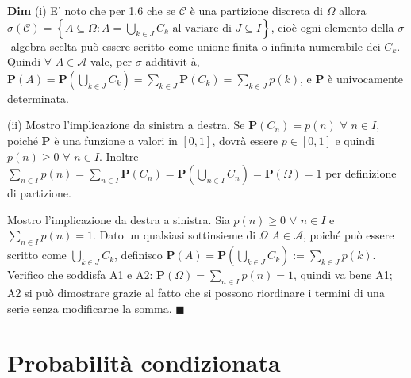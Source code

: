 \documentclass{article}
\begin{document}
\textbf{Dim }(i) E' noto che per 1.6 che se $\mathcal{C}$ \`{e} una
partizione discreta di $\Omega $ allora $\sigma \left( \mathcal{C}\right)
=\left\{ A\subseteq \Omega :A=\bigcup_{k\in J}C_{k}\text{ al variare di }%
J\subseteq I\right\} $, cio\`{e} ogni elemento della $\sigma $-algebra
scelta pu\`{o} essere scritto come unione finita o infinita numerabile dei $%
C_{k}$. Quindi $\forall $ $A\in \mathcal{A}$ vale, per $\sigma $-additivit%
\`{a}, $\mathbf{P}\left( A\right) =\mathbf{P}\left( \bigcup_{k\in
J}C_{k}\right) =\sum_{k\in J}\mathbf{P}\left( C_{k}\right) =\sum_{k\in
J}p\left( k\right) $, e $\mathbf{P}$ \`{e} univocamente determinata.

(ii) Mostro l'implicazione da sinistra a destra. Se $\mathbf{P}\left(
C_{n}\right) =p\left( n\right) $ $\forall $ $n\in I$, poich\'{e} $\mathbf{P}$
\`{e} una funzione a valori in $\left[ 0,1\right] $, dovr\`{a} essere $p\in %
\left[ 0,1\right] $ e quindi $p\left( n\right) \geq 0$ $\forall $ $n\in I$.
Inoltre $\sum_{n\in I}p\left( n\right) =\sum_{n\in I}\mathbf{P}\left(
C_{n}\right) =\mathbf{P}\left( \bigcup_{n\in I}C_{n}\right) =\mathbf{P}%
\left( \Omega \right) =1$ per definizione di partizione.

Mostro l'implicazione da destra a sinistra. Sia $p\left( n\right) \geq 0$ $%
\forall $ $n\in I$ e $\sum_{n\in I}p\left( n\right) =1$. Dato un qualsiasi
sottinsieme di $\Omega $ $A\in \mathcal{A}$, poich\'{e} pu\`{o} essere
scritto come $\bigcup_{k\in J}C_{k}$, definisco $\mathbf{P}\left( A\right) =%
\mathbf{P}\left( \bigcup_{k\in J}C_{k}\right) :=\sum_{k\in J}p\left(
k\right) $. Verifico che soddisfa A1 e A2: $\mathbf{P}\left( \Omega \right)
=\sum_{n\in I}p\left( n\right) =1$, quindi va bene A1; A2 si pu\`{o}
dimostrare grazie al fatto che si possono riordinare i termini di una serie
senza modificarne la somma. $\blacksquare $

\section{Probabilit\`{a} condizionata}
\end{document}
